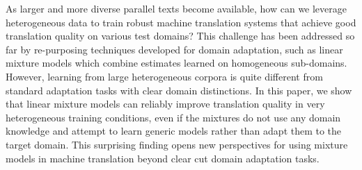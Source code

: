 As larger and more diverse parallel texts become available, how can we leverage heterogeneous data to train robust machine translation systems that achieve good translation quality on various test domains? This challenge has been addressed so far by re-purposing techniques developed for domain adaptation, such as linear mixture models which combine estimates learned on homogeneous sub-domains. However, learning from large heterogeneous corpora is quite different from standard adaptation tasks with clear domain distinctions.  In this paper, we show that linear mixture models can reliably improve translation quality in very heterogeneous training conditions, even if the mixtures do not use any domain knowledge and attempt to learn generic models rather than adapt them to the target domain. This surprising finding opens new perspectives for using mixture models in machine translation beyond clear cut domain adaptation tasks.
